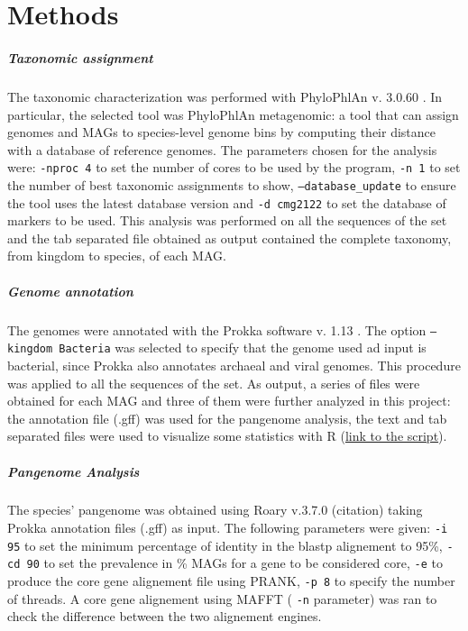 \section*{Methods}




\nocite{Tange2011a}

\subparagraph*{Taxonomic assignment}

The taxonomic characterization was performed with PhyloPhlAn v. 3.0.60 \cite{phylophlan}. In particular, the selected tool was PhyloPhlAn metagenomic: a tool that can assign genomes and MAGs to species-level genome bins by computing their distance with a database of reference genomes. The parameters chosen for the analysis were: \texttt{-nproc 4} to set the number of cores to be used by the program, \texttt{-n 1} to set the number of best taxonomic assignments to show, \texttt{--database\_update} to ensure the tool uses the latest database version and \texttt{-d cmg2122} to set the database of markers to be used. This analysis was performed on all the sequences of the set and the tab separated file obtained as output contained the complete taxonomy, from kingdom to species, of each MAG.

\subparagraph*{Genome annotation}

The genomes were annotated with the Prokka software v. 1.13 \cite{prokka}. The option \texttt{--kingdom Bacteria} was selected to specify that the genome used ad input is bacterial, since Prokka also annotates archaeal and viral genomes. This procedure was applied to all the sequences of the set. As output, a series of files were obtained for each MAG and three of them were further analyzed in this project: the annotation file (.gff) was used for the pangenome analysis, the text and tab separated files were used to visualize some statistics with R (\href{https://github.com/enricofrigoli/cmg_project/blob/main/Rscript/CMG_Rscript.md}{link to the script}).


\subparagraph*{Pangenome Analysis}

The species' pangenome was obtained using Roary v.3.7.0 (citation) taking Prokka annotation files (.gff) as input. 
The following parameters were given: \texttt{-i 95} to set the minimum percentage of identity
in the blastp alignement to 95\%, \texttt{-cd 90} to set the prevalence in \% MAGs for a gene
to be considered core, \texttt{-e} to produce the core gene alignement file using PRANK, \texttt{-p 8} to
specify the number of threads. A core gene alignement using MAFFT ( \texttt{-n} parameter) was ran to check
the difference between the two alignement engines.

